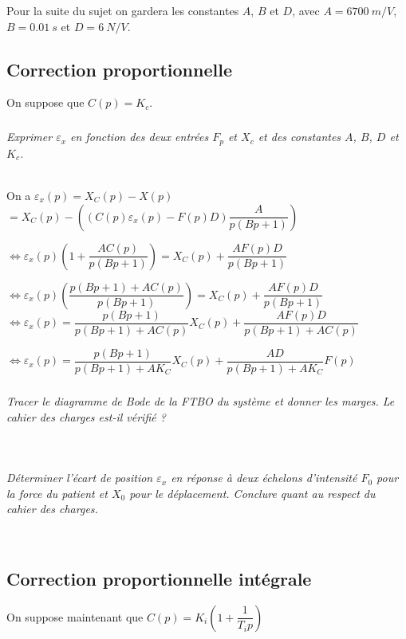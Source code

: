 \documentclass[10pt,fleqn]{article} %
\begin{document}
\begin{multicols}{2}
Pour la suite du sujet on gardera les constantes $A$, $B$ et $D$, avec $A=\SI{6700}{m/V}$, $B=\SI{0,01}{s}$ et $D=\SI{6}{N/V}$.


\subsection*{Correction proportionnelle}

On suppose que $C(p)=K_c$. 


\subparagraph{}\textit{Exprimer $\varepsilon_x$ en fonction des deux entrées $F_p$ et $X_c$ et des constantes $A$, $B$, $D$ et $K_c$.}
\ifprof
\begin{corrige}~\\
On a $\varepsilon_x(p)=X_C(p)-X(p)$ 
$ =X_C(p)-\left(\left(C(p)\varepsilon_x(p)-F(p)D \right)\dfrac{A}{p\left(Bp+1 \right)}  \right) $

$\Leftrightarrow \varepsilon_x(p) \left(1+ \dfrac{AC(p)}{p\left(Bp+1 \right)}\right)=X_C(p)+\dfrac{AF(p)D }{p\left(Bp+1 \right)}   $

$\Leftrightarrow \varepsilon_x(p) \left( \dfrac{p\left(Bp+1 \right)+AC(p)}{p\left(Bp+1 \right)}\right)=X_C(p)+\dfrac{AF(p)D }{p\left(Bp+1 \right)}   $
$\Leftrightarrow \varepsilon_x(p) =\dfrac{p\left(Bp+1 \right)}{p\left(Bp+1 \right)+AC(p)}X_C(p)+\dfrac{AF(p)D }{p\left(Bp+1 \right)+AC(p)}  $

$\Leftrightarrow \varepsilon_x(p) =\dfrac{p\left(Bp+1 \right)}{p\left(Bp+1 \right)+AK_C}X_C(p)+\dfrac{AD }{p\left(Bp+1 \right)+AK_C} F(p) $
\end{corrige}
\else
\fi


\subparagraph{}\textit{Tracer le diagramme de Bode de la FTBO du système et donner les marges. Le cahier des charges est-il vérifié ?}
\ifprof
\begin{corrige}~\\
\end{corrige}
\else
\fi

\subparagraph{}\textit{Déterminer l'écart de position $\varepsilon_x$ en réponse à deux échelons d'intensité $F_0$ pour la force du patient et $X_0$ pour le déplacement. Conclure quant au respect du cahier des charges.}
\ifprof
\begin{corrige}~\\
\end{corrige}
\else
\fi

\subsection*{Correction proportionnelle intégrale}
On suppose maintenant que $C(p)=K_i\left(1+\dfrac{1}{T_ip}\right)$


\end{multicols}
\end{document}

